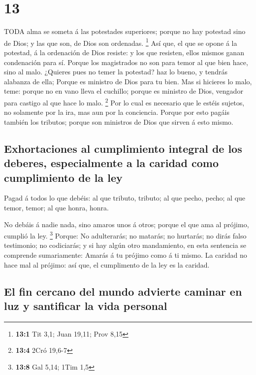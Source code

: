 \hypertarget{section-12}{%
\section{13}\label{section-12}}

 TODA alma se someta á las potestades superiores; porque no
hay potestad sino de Dios; y las que son, de Dios son ordenadas.
\footnote{\textbf{13:1} Tit 3,1; Juan 19,11; Prov 8,15}  Así
que, el que se opone á la potestad, á la ordenación de Dios resiste: y
los que resisten, ellos mismos ganan condenación para sí. 
Porque los magistrados no son para temor al que bien hace, sino al malo.
¿Quieres pues no temer la potestad? haz lo bueno, y tendrás alabanza de
ella;  Porque es ministro de Dios para tu bien. Mas si
hicieres lo malo, teme: porque no en vano lleva el cuchillo; porque es
ministro de Dios, vengador para castigo al que hace lo malo. \footnote{\textbf{13:4}
  2Cró 19,6-7}  Por lo cual es necesario que le estéis
sujetos, no solamente por la ira, mas aun por la conciencia.
 Porque por esto pagáis también los tributos; porque son
ministros de Dios que sirven á esto mismo.

\hypertarget{exhortaciones-al-cumplimiento-integral-de-los-deberes-especialmente-a-la-caridad-como-cumplimiento-de-la-ley}{%
\subsection{Exhortaciones al cumplimiento integral de los deberes,
especialmente a la caridad como cumplimiento de la
ley}\label{exhortaciones-al-cumplimiento-integral-de-los-deberes-especialmente-a-la-caridad-como-cumplimiento-de-la-ley}}

 Pagad á todos lo que debéis: al que tributo, tributo; al
que pecho, pecho; al que temor, temor; al que honra, honra.

 No debáis á nadie nada, sino amaros unos á otros; porque el
que ama al prójimo, cumplió la ley. \footnote{\textbf{13:8} Gal 5,14;
  1Tim 1,5}  Porque: No adulterarás; no matarás; no
hurtarás; no dirás falso testimonio; no codiciarás; y si hay algún otro
mandamiento, en esta sentencia se comprende sumariamente: Amarás á tu
prójimo como á ti mismo.  La caridad no hace mal al
prójimo: así que, el cumplimento de la ley es la caridad.

\hypertarget{el-fin-cercano-del-mundo-advierte-caminar-en-luz-y-santificar-la-vida-personal}{%
\subsection{El fin cercano del mundo advierte caminar en luz y
santificar la vida
personal}\label{el-fin-cercano-del-mundo-advierte-caminar-en-luz-y-santificar-la-vida-personal}}

